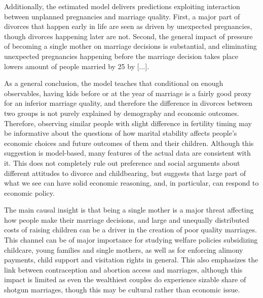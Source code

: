 \documentclass[12pt,letter]{article}
\begin{document}
Additionally, the estimated model delivers predictions exploiting interaction between unplanned pregnancies and marriage quality. First, a major part of divorces that happen early in life are seen as driven by unexpected pregnancies, though divorces happening later are not. Second, the general impact of pressure of becoming a single mother on marriage decisions is substantial, and eliminating unexpected pregnancies happening before the marriage decision takes place lowers amount of people married by 25 by [...].

As a general conclusion, the model teaches that conditional on enough observables, having kids before or at the year of marriage is a fairly good proxy for an inferior marriage quality, and therefore the difference in divorces between two groups is not purely explained by demography and economic outcomes. Therefore, observing similar people with slight difference in fertility timing may be informative about the questions of how marital stability affects people's economic choices and future outcomes of them and their children. Although this suggestion is model-based, many features of the actual data are consistent with it. This does not completely rule out preference and social arguments about different attitudes to divorce and childbearing, but suggests that large part of what we see can have solid economic reasoning, and, in particular, can respond to economic policy. 

The main causal insight is that being a single mother is a major threat affecting how people make their marriage decisions, and large and unequally distributed costs of raising children can be a driver in the creation of poor quality marriages. This channel can be of major importance for studying welfare policies subsidizing childcare, young families and single mothers, as well as for enforcing alimony payments, child support and visitation rights in general. This also emphasizes the link between contraception and abortion access and marriages, although this impact is limited as even the wealthiest couples do experience sizable share of shotgun marriages, though this may be cultural rather than economic issue.
\end{document}
